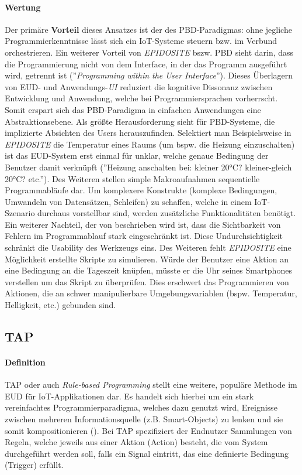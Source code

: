\paragraph{Wertung} Der primäre \textbf{Vorteil} dieses Ansatzes ist der des \ac{PBD}-Paradigmas: ohne jegliche Programmierkenntnisse lässt sich ein \ac{IoT}-Systeme steuern bzw. im Verbund orchestrieren. Ein weiterer Vorteil von \textit{EPIDOSITE} bszw. \ac{PBD} sieht \cite{cypher1993pbd} darin, dass die Programmierung nicht von dem Interface, in der das Programm ausgeführt wird, getrennt ist (''\textit{Programming within the User Interface}''). Dieses Überlagern von \ac{EUD}- und Anwendungs-\textit{UI} reduziert die kognitive Dissonanz zwischen Entwicklung und Anwendung, welche bei Programmiersprachen vorherrscht. Somit erspart sich das \ac{PBD}-Paradigma in einfachen Anwendungen eine Abstraktionsebene. Als größte Herausforderung sieht \cite{cypher1993pbd} für \ac{PBD}-Systeme, die implizierte Absichten des Users herauszufinden. Selektiert man Beispielsweise in \textit{EPIDOSITE} die Temperatur eines Raums (um bspw. die Heizung einzuschalten) ist das \ac{EUD}-System erst einmal für unklar, welche genaue Bedingung der Benutzer damit verknüpft (''Heizung anschalten bei: kleiner 20°C? kleiner-gleich 20°C? etc.''). Des Weiteren stellen simple Makroaufnahmen sequentielle Programmabläufe dar. Um komplexere Konstrukte (komplexe Bedingungen, Umwandeln von Datensätzen, Schleifen) zu schaffen, welche in einem \ac{IoT}-Szenario durchaus vorstellbar sind, werden zusätzliche Funktionalitäten benötigt. Ein weiterer Nachteil, der von \cite{li2017programming} beschrieben wird ist, dass die Sichtbarkeit von Fehlern im Programmablauf stark eingeschränkt ist. Diese Undurchsichtigkeit schränkt die Usability des Werkzeugs eins. Des Weiteren fehlt \textit{EPIDOSITE} eine Möglichkeit erstellte Skripte zu simulieren. Würde der Benutzer eine Aktion an eine Bedingung an die Tageszeit knüpfen, müsste er die Uhr seines Smartphones verstellen um das Skript zu überprüfen. Dies erschwert das Programmieren von Aktionen, die an schwer manipulierbare Umgebungsvariablen (bspw. Temperatur, Helligkeit, etc.) gebunden sind.

\subsection{\acl{TAP}}

\paragraph{Definition} \ac{TAP} oder auch \textit{Rule-based Programming} stellt eine weitere, populäre Methode im \ac{EUD} für \ac{IoT}-Applikationen dar. Es handelt sich hierbei um ein stark vereinfachtes Programmierparadigma, welches dazu genutzt wird, Ereignisse zwischen mehreren Informationsquelle (z.B. Smart-Objects) zu lenken und sie somit kompositionieren (\cite{ur2014practical}). Bei \ac{TAP} spezifiziert der Endnutzer Sammlungen von Regeln, welche jeweils aus einer Aktion (Action) besteht, die vom System durchgeführt werden soll, falls ein Signal eintritt, das eine definierte Bedingung (Trigger) erfüllt. 


